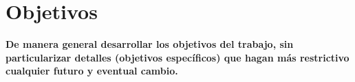 \section{Objetivos}\label{sc:Obj}

\textbf{De manera general desarrollar los objetivos del trabajo, sin particularizar detalles (objetivos específicos) que hagan más restrictivo cualquier futuro y eventual cambio.}